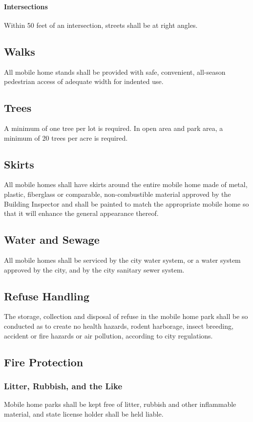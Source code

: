 \paragraph{Intersections}
Within 50 feet of an intersection, streets shall be at right angles.
\subsection{Walks}
All mobile home stands shall be provided with safe, convenient, all-season pedestrian access of adequate width for indented use.
\subsection{Trees}
A minimum of one tree per lot is required. In open area and park area, a minimum of 20 trees per acre is required.
\subsection{Skirts}
All mobile homes shall have skirts around the entire mobile home made of metal, plastic, fiberglass or comparable, non-combustible material approved by the Building Inspector and shall be painted to match the appropriate mobile home so that it will enhance the general appearance thereof.
\subsection{Water and Sewage}
All mobile homes shall be serviced by the city water system, or a water system approved by the city, and by the city sanitary sewer system.
\subsection{Refuse Handling}
The storage, collection and disposal of refuse in the mobile home park shall be so conducted as to create no health hazards, rodent harborage, insect breeding, accident or fire hazards or air pollution, according to city regulations.
\subsection{Fire Protection}
\subsubsection{Litter, Rubbish, and the Like}
Mobile home parks shall be kept free of litter, rubbish and other inflammable material, and state license holder shall be held liable.
